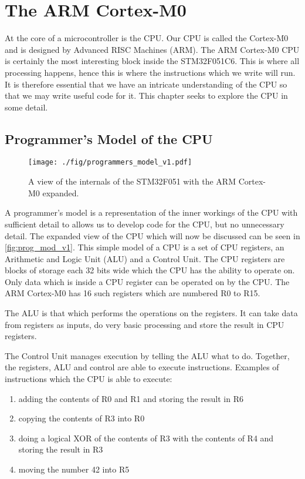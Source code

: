 \chapter{The ARM Cortex-M0}

At the core of a microcontroller is the CPU. Our CPU is called the Cortex-M0 and is designed by Advanced RISC Machines (ARM).
The ARM Cortex-M0 CPU is certainly the most interesting block inside the STM32F051C6. This is where all processing happens, hence this is where the instructions which we write will run. It is therefore essential that we have an intricate understanding of the CPU so that we may write useful code for it. This chapter seeks to explore the CPU in some detail.

\section{Programmer's Model of the CPU}
\label{sec:programmer's_model_of_the_CPU}
\begin{figure}[t]
  \centering
  \texttt{[image: ./fig/programmers\_model\_v1.pdf]}
  \caption{A view of the internals of the STM32F051 with the ARM Cortex-M0 expanded.}
  \label{fig:prog_mod_v1}
\end{figure}
A programmer's model is a representation of the inner workings of the CPU with sufficient detail to allows us to develop code for the CPU, but no unnecessary detail. The expanded view of the CPU which will now be discussed can be seen in \autoref{fig:prog_mod_v1}. This simple model of a CPU is a set of CPU registers, an Arithmetic and Logic Unit (ALU) and a Control Unit. The CPU registers are blocks of storage each 32 bits wide which the CPU has the ability to operate on. Only data which is inside a CPU register can be operated on by the CPU. The ARM Cortex-M0 has 16 such registers which are numbered R0 to R15. 

The ALU is that which performs the operations on the registers. It can take data from registers as inputs, do very basic processing and store the result in CPU registers. 

The Control Unit manages execution by telling the ALU what to do. Together, the registers, ALU and control are able to execute instructions. 
Examples of instructions which the CPU is able to execute:
\begin{enumerate}
  \item adding the contents of R0 and R1 and storing the result in R6
  \item copying the contents of R3 into R0
  \item doing a logical XOR of the contents of R3 with the contents of R4 and storing the result in R3
  \item moving the number 42 into R5
\end{enumerate}


